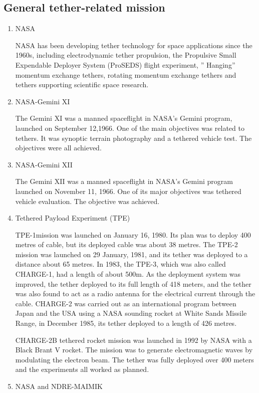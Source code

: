 \subsection{General tether-related mission}
\begin{enumerate} 
\item{NASA}
 
NASA has been developing tether technology for space applications since the 1960s, including electrodynamic tether propulsion, the Propulsive Small Expendable Deployer System (ProSEDS) flight experiment, ” Hanging” momentum exchange tethers, rotating momentum exchange tethers and tethers supporting scientific space research. 

\item{NASA-Gemini XI} 

The Gemini XI was a manned spaceflight in NASA's Gemini program, launched on September 12,1966. One of the main objectives was related to tethers. It was synoptic terrain photography and a tethered vehicle test. The objectives were all achieved. 

\item{NASA-Gemini XII} 
   
The Gemini XII was a manned spaceflight in NASA's Gemini program launched on November 11, 1966. One of its major objectives was tethered vehicle evaluation. The objective was achieved.
\item{Tethered Payload Experiment (TPE)}

TPE-1mission was launched on January 16, 1980. Its plan was to deploy 400 metres of cable, but its deployed cable was about 38 metres. The TPE-2 mission was launched on 29 January, 1981, and its tether was deployed to a distance about 65 metres. In 1983, the TPE-3, which was also called CHARGE-1, had a length of about 500m. As the deployment system was improved, the tether deployed to its full length of 418 meters, and the tether was also found to act as a radio antenna for the electrical current through the cable. CHARGE-2 was carried out as an international program between Japan and the USA using a NASA sounding rocket at White Sands Missile Range, in December 1985, its tether deployed to a length of 426 metres.

CHARGE-2B tethered rocket mission was launched in 1992 by NASA with a Black Brant V rocket. The mission was to generate electromagnetic waves by modulating the electron beam. The tether was fully deployed over 400 meters and the experiments all worked as planned.
\item{NASA and NDRE-MAIMIK}


\end{enumerate}
